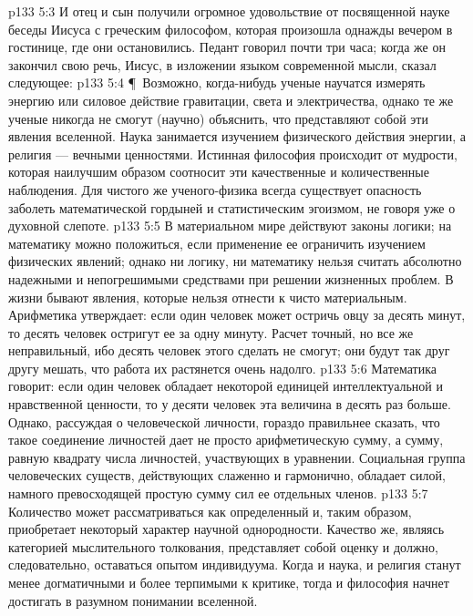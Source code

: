 \vs p133 5:3 И отец и сын получили огромное удовольствие от посвященной науке беседы Иисуса с греческим философом, которая произошла однажды вечером в гостинице, где они остановились. Педант говорил почти три часа; когда же он закончил свою речь, Иисус, в изложении языком современной мысли, сказал следующее:
\vs p133 5:4 \P\ Возможно, когда\hyp{}нибудь ученые научатся измерять энергию или силовое действие гравитации, света и электричества, однако те же ученые никогда не смогут (научно) объяснить, что представляют собой эти явления вселенной. Наука занимается изучением физического действия энергии, а религия --- вечными ценностями. Истинная философия происходит от мудрости, которая наилучшим образом соотносит эти качественные и количественные наблюдения. Для чистого же ученого\hyp{}физика всегда существует опасность заболеть математической гордыней и статистическим эгоизмом, не говоря уже о духовной слепоте.
\vs p133 5:5 В материальном мире действуют законы логики; на математику можно положиться, если применение ее ограничить изучением физических явлений; однако ни логику, ни математику нельзя считать абсолютно надежными и непогрешимыми средствами при решении жизненных проблем. В жизни бывают явления, которые нельзя отнести к чисто материальным. Арифметика утверждает: если один человек может остричь овцу за десять минут, то десять человек остригут ее за одну минуту. Расчет точный, но все же неправильный, ибо десять человек этого сделать не смогут; они будут так друг другу мешать, что работа их растянется очень надолго.
\vs p133 5:6 Математика говорит: если один человек обладает некоторой единицей интеллектуальной и нравственной ценности, то у десяти человек эта величина в десять раз больше. Однако, рассуждая о человеческой личности, гораздо правильнее сказать, что такое соединение личностей дает не просто арифметическую сумму, а сумму, равную квадрату числа личностей, участвующих в уравнении. Социальная группа человеческих существ, действующих слаженно и гармонично, обладает силой, намного превосходящей простую сумму сил ее отдельных членов.
\vs p133 5:7 Количество может рассматриваться как определенный  и, таким образом, приобретает некоторый характер научной однородности. Качество же, являясь категорией мыслительного толкования, представляет собой оценку  и должно, следовательно, оставаться опытом индивидуума. Когда и наука, и религия станут менее догматичными и более терпимыми к критике, тогда и философия начнет достигать  в разумном понимании вселенной.

